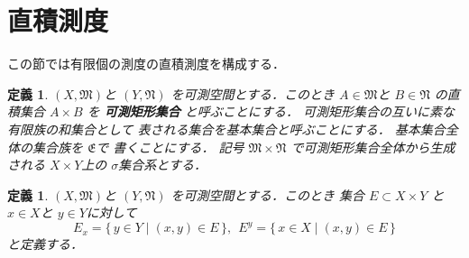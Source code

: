 \documentclass[leqno, a4paper, 12pt]{jsarticle}
\newtheorem{df}[thm]{定義}
\begin{document}
\section{直積測度}
この節では有限個の測度の直積測度を構成する．

\begin{df}
$(X, \mathfrak{M})$と
$(Y, \mathfrak{N})$
を可測空間とする．このとき
$A\in \mathfrak{M}$と
$B\in \mathfrak{N}$
の直積集合
$A\times B$
を
\textbf{可測矩形集合}
と呼ぶことにする．
可測矩形集合の互いに素な有限族の和集合として
表される集合を基本集合と呼ぶことにする．
基本集合全体の集合族を
$\mathfrak{E}$で
書くことにする．
記号
$\mathfrak{M}\times \mathfrak{N}$
で可測矩形集合全体から生成される
$X\times Y$上の
$\sigma$集合系とする．
\end{df}

\begin{df}
$(X, \mathfrak{M})$と
$(Y, \mathfrak{N})$
を可測空間とする．このとき
集合
$E\subset X\times Y$
と
$x\in X$と
$y\in Y$に対して
\[
E_{x}=\{\, y\in Y\mid (x, y)\in E\, \}, \ \ 
E^{y}=\{\, x\in X\mid (x, y)\in E\, \}
\]
と定義する．
\end{df}
\end{document}
